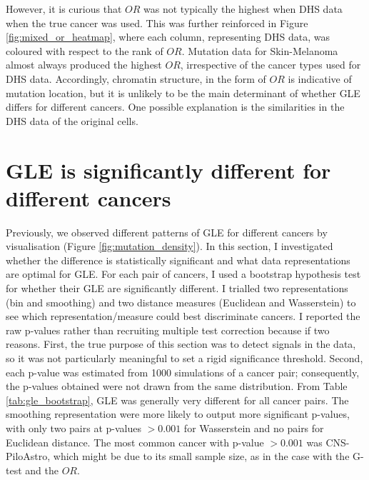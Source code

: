 However, it is curious that $OR$ was not typically the highest when DHS data when the true cancer was used. This was further reinforced in Figure \ref{fig:mixed_or_heatmap}, where each column, representing DHS data, was coloured with respect to the rank of $OR$. Mutation data for Skin-Melanoma almost always produced the highest $OR$, irrespective of the cancer types used for DHS data. Accordingly, chromatin structure, in the form of $OR$ is indicative of mutation location, but it is unlikely to be the main determinant of whether GLE differs for different cancers. One possible explanation is the similarities in the DHS data of the original cells.



\newpage
\section{GLE is significantly different for different cancers}
Previously, we observed different patterns of GLE for different cancers by visualisation (Figure \ref{fig:mutation_density}). In this section, I investigated whether the difference is statistically significant and what data representations are optimal for GLE. For each pair of cancers, I used a bootstrap hypothesis test for whether their GLE are significantly different. I trialled two representations (bin and smoothing) and two distance measures (Euclidean and Wasserstein) to see which representation/measure could best discriminate cancers. I reported the raw p-values rather than recruiting multiple test correction because if two reasons. First, the true purpose of this section was to detect signals in the data, so it was not particularly meaningful to set a rigid significance threshold. Second, each p-value was estimated from 1000 simulations of a cancer pair; consequently, the p-values obtained were not drawn from the same distribution. From Table \ref{tab:gle_bootstrap}, GLE was generally very different for all cancer pairs. The smoothing representation were more likely to output more significant p-values, with only two pairs at p-values $>0.001$ for Wasserstein and no pairs for Euclidean distance. The most common cancer with p-value $>0.001$ was CNS-PiloAstro, which might be due to its small sample size, as in the case with the G-test and the $OR$. 




